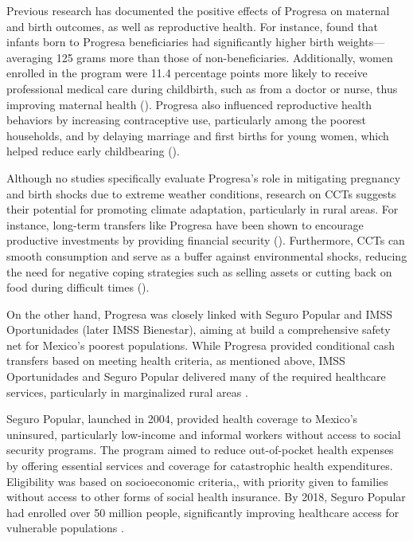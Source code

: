 \documentclass[12pt, oneside]{article}      %
\begin{document}
Previous research has documented the positive effects of Progresa on maternal and birth outcomes, as well as reproductive health. For instance, \cite{Barber2008} found that infants born to Progresa beneficiaries had significantly higher birth weights—averaging 125 grams more than those of non-beneficiaries. Additionally, women enrolled in the program were 11.4 percentage points more likely to receive professional medical care during childbirth, such as from a doctor or nurse, thus improving maternal health (\cite{Urquieta2009}). Progresa also influenced reproductive health behaviors by increasing contraceptive use, particularly among the poorest households, and by delaying marriage and first births for young women, which helped reduce early childbearing (\cite{LamadridFigueroa2010}).

Although no studies specifically evaluate Progresa's role in mitigating pregnancy and birth shocks due to extreme weather conditions, research on CCTs suggests their potential for promoting climate adaptation, particularly in rural areas. For instance, long-term transfers like Progresa have been shown to encourage productive investments by providing financial security (\cite{Gertler2012}). Furthermore, CCTs can smooth consumption and serve as a buffer against environmental shocks, reducing the need for negative coping strategies such as selling assets or cutting back on food during difficult times (\cite{macours2012transfers}).


On the other hand, Progresa was closely linked with Seguro Popular and IMSS Oportunidades (later IMSS Bienestar), aiming at build a comprehensive safety net for Mexico's poorest populations. While Progresa provided conditional cash transfers based on meeting health criteria, as mentioned above, IMSS Oportunidades and Seguro Popular delivered many of the required healthcare services, particularly in marginalized rural areas \cite{gonzalez2020mexico}.

Seguro Popular, launched in 2004, provided health coverage to Mexico's uninsured, particularly low-income and informal workers without access to social security programs. The program aimed to reduce out-of-pocket health expenses by offering essential services and coverage for catastrophic health expenditures. Eligibility was based on socioeconomic criteria,, with priority given to families without access to other forms of social health insurance. By 2018, Seguro Popular had enrolled over 50 million people, significantly improving healthcare access for vulnerable populations \cite{ChemorRuiz2018}.
\end{document}
